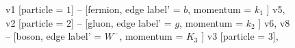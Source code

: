 \documentclass{revtex4}
\begin{document}
\begin{figure}[!htb]
\begin{center}
{    %
v1 [particle = \(1\)] -- [fermion, edge label' = \(b\), momentum = \(k_{1}\) ] v5, 
v2 [particle = \(2\)] -- [gluon, edge label' = \(g\), momentum = \(k_{2}\) ] v6, 
v8 -- [boson, edge label' = \(W^{-}\), momentum = \(K_{3}\) ] v3 [particle = \(3\)], 
}
\end{center}
\end{figure}
\end{document}
